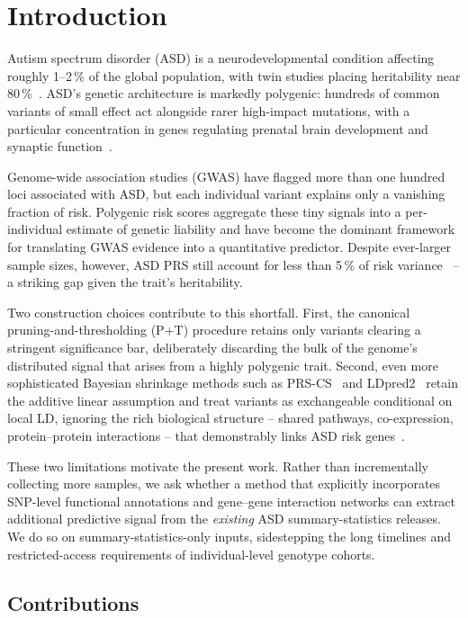 \section{Introduction}
\label{sec:intro}

Autism spectrum disorder (ASD) is a neurodevelopmental condition affecting
roughly 1--2\,\% of the global population, with twin studies placing
heritability near 80\,\%~\cite{havdahl2021}. ASD's genetic architecture is
markedly polygenic: hundreds of common variants of small effect act
alongside rarer high-impact mutations, with a particular concentration in
genes regulating prenatal brain development and synaptic
function~\cite{satterstrom2020,grove2019}.

Genome-wide association studies (GWAS) have flagged more than one hundred
loci associated with ASD, but each individual variant explains only a
vanishing fraction of risk. Polygenic risk scores aggregate these tiny
signals into a per-individual estimate of genetic liability and have
become the dominant framework for translating GWAS evidence into a
quantitative predictor. Despite ever-larger sample sizes, however, ASD
PRS still account for less than 5\,\% of risk
variance~\cite{grove2019,havdahl2021} -- a striking gap given the trait's
heritability.

Two construction choices contribute to this shortfall. First, the
canonical pruning-and-thresholding (P+T) procedure retains only variants
clearing a stringent significance bar, deliberately discarding the bulk of
the genome's distributed signal that arises from a highly polygenic trait.
Second, even more sophisticated Bayesian shrinkage methods such as
PRS-CS~\cite{ge2019prscs} and LDpred2~\cite{prive2020ldpred2} retain the
additive linear assumption and treat variants as exchangeable conditional
on local LD, ignoring the rich biological structure -- shared pathways,
co-expression, protein--protein interactions -- that demonstrably links
ASD risk genes~\cite{satterstrom2020,dong2023}.

These two limitations motivate the present work. Rather than incrementally
collecting more samples, we ask whether a method that explicitly
incorporates SNP-level functional annotations and gene--gene interaction
networks can extract additional predictive signal from the
\emph{existing} ASD summary-statistics releases. We do so on
summary-statistics-only inputs, sidestepping the long timelines and
restricted-access requirements of individual-level genotype cohorts.

\subsection*{Contributions}

